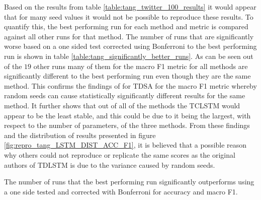 Based on the results from table \ref{table:tang_twitter_100_results} it would appear that for many seed values it would not be possible to reproduce these results. To quantify this, the best performing run for each method and metric is compared against all other runs for that method. The number of runs that are significantly worse based on a one sided test corrected using Bonferroni to the best performing run is shown in table \ref{table:tang_significantly_better_runs}. As can be seen out of the $19$ other runs many of them for the macro F1 metric for all methods are significantly different to the best performing run even though they are the same method. This confirms the findings of \citet{reimers-gurevych-2017-reporting} for TDSA for the macro F1 metric whereby random seeds can cause statistically significantly different results for the same method. It further shows that out of all of the methods the TCLSTM would appear to be the least stable, and this could be due to it being the largest, with respect to the number of parameters, of the three methods. From these findings and the distribution of results presented in figure \ref{fig:repro_tang_LSTM_DIST_ACC_F1}, it is believed that a possible reason why others could not reproduce \citep{tay2018learning} or replicate \citep{chen-etal-2017-recurrent} the same scores as the original authors of TDLSTM \citep{tang-etal-2016-aspect} is due to the variance caused by random seeds.

\begin{table}[!h]
    \centering
    
    \caption{The number of runs that the best performing run significantly outperforms using a one side tested and corrected with Bonferroni for accuracy and macro F1.}
    \label{table:tang_significantly_better_runs}
\end{table}

